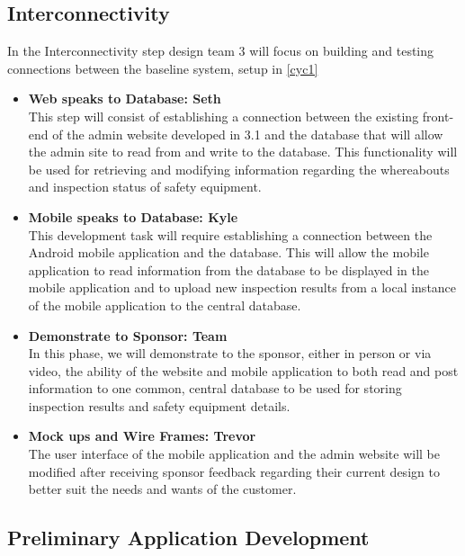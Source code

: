 \documentclass[Letter,11pt]{article}
\begin{document}
	\subsection{Interconnectivity}\label{connect}
		In the Interconnectivity step design team 3 will focus on building and testing connections between the baseline system, setup in \ref{cyc1}
		\begin{itemize}
			\item\textbf{Web speaks to Database: Seth}\\
			This step will consist of establishing a connection between the existing front-end of the admin website developed in 3.1 and the database that will allow the admin site to read from and write to the database.  This functionality will be used for retrieving and modifying information regarding the whereabouts and inspection status of safety equipment. 

			
			\item \textbf{Mobile speaks to Database: Kyle}\\
			This development task will require establishing a connection between the Android mobile application and the database.  This will allow the mobile application to read information from the database to be displayed in the mobile application and to upload new inspection results from a local instance of the mobile application to the central database.

			\item\textbf{Demonstrate to Sponsor: Team}\\
			 In this phase, we will demonstrate to the sponsor, either in person or via video, the ability of the website and mobile application to both read and post information to one common, central database to be used for storing inspection results and safety equipment details.

			
			\item\textbf{Mock ups and Wire Frames: Trevor}\\
			The user interface of the mobile application and the admin website will be modified after receiving sponsor feedback regarding their current design to better suit the needs and wants of the customer.
			
			
		\end{itemize}
		
		\subsection{Preliminary Application Development}\label{dev1}
		
\end{document}
